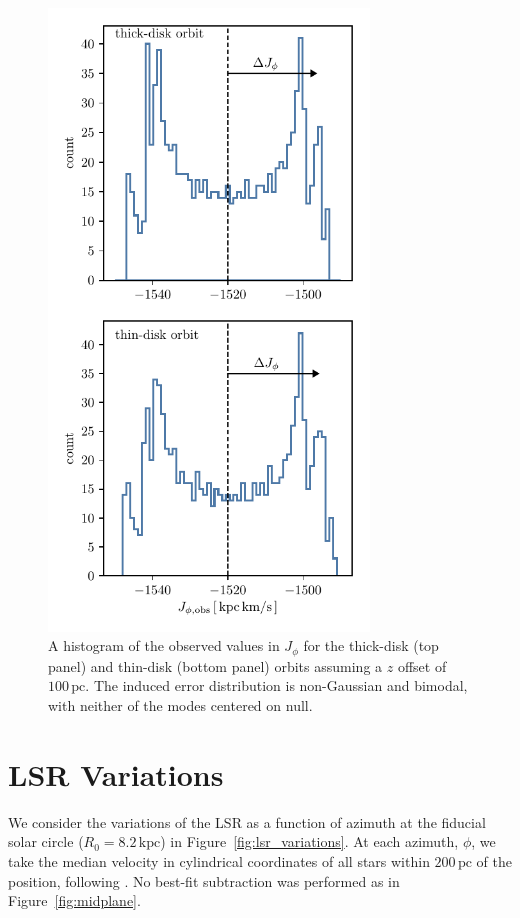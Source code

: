 \documentclass[twocolumn]{aastex62}
\newcommand{\pc}{\text{pc}}
\newcommand{\kpc}{\text{kpc}}
\begin{document}
\begin{figure}
\begin{center}
\includegraphics[width=3.35224200913in]{fig/schmactions_Jphi_xerr_hist.pdf}
\end{center}
\caption{A histogram of the observed values in $J_{\phi}$ for the thick-disk
(top panel) and thin-disk (bottom panel) orbits assuming a $z$ offset of
$100\,\pc$. The induced error distribution is non-Gaussian and bimodal, with
neither of the modes centered on null.}
\label{fig:Jphi_xerr_hist}
\end{figure}

\section{LSR Variations} \label{app:lsr}
We consider the variations of the LSR as a function of azimuth at the fiducial
solar circle ($R_{0} = 8.2\,\kpc$) in Figure~\ref{fig:lsr_variations}. At
each azimuth, $\phi$, we take the median velocity in cylindrical coordinates
of all stars within $200\,\pc$ of the position, following
\citet{2018arXiv180610564S}. No best-fit subtraction was performed as in
Figure~\ref{fig:midplane}.
\end{document}

